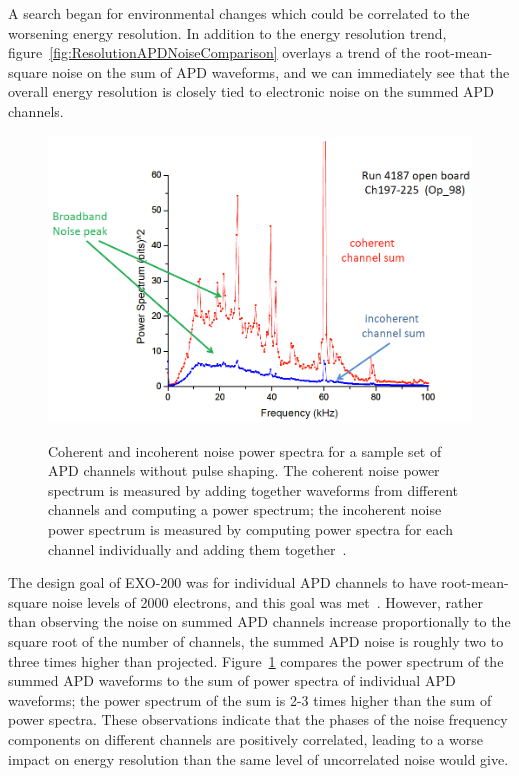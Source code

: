 A search began for environmental changes which could be correlated to the worsening energy resolution.  In addition to the energy resolution trend, figure~\ref{fig:ResolutionAPDNoiseComparison} overlays a trend of the root-mean-square noise on the sum of APD waveforms, and we can immediately see that the overall energy resolution is closely tied to electronic noise on the summed APD channels.

\begin{figure}
\begin{center}
\includegraphics[keepaspectratio=true,width=\textwidth]{APDNoisePowerSpectrum.png}
\end{center}
\renewcommand{\baselinestretch}{1}
\small\normalsize
\begin{quote}
\caption{Coherent and incoherent noise power spectra for a sample set of APD channels without pulse shaping.  The coherent noise power spectrum is measured by adding together waveforms from different channels and computing a power spectrum; the incoherent noise power spectrum is measured by computing power spectra for each channel individually and adding them together~\cite{ElectronicsUpgradeReport}.}
\label{fig:APDNoisePowerSpectrum}
\end{quote}
\end{figure}
\renewcommand{\baselinestretch}{2}
\small\normalsize

The design goal of EXO-200 was for individual APD channels to have root-mean-square noise levels of 2000 electrons, and this goal was met~\cite{ElectronicsUpgradeReport}.  However, rather than observing the noise on summed APD channels increase proportionally to the square root of the number of channels, the summed APD noise is roughly two to three times higher than projected.  Figure~\ref{fig:APDNoisePowerSpectrum} compares the power spectrum of the summed APD waveforms to the sum of power spectra of individual APD waveforms; the power spectrum of the sum is 2-3 times higher than the sum of power spectra.  These observations indicate that the phases of the noise frequency components on different channels are positively correlated, leading to a worse impact on energy resolution than the same level of uncorrelated noise would give.

